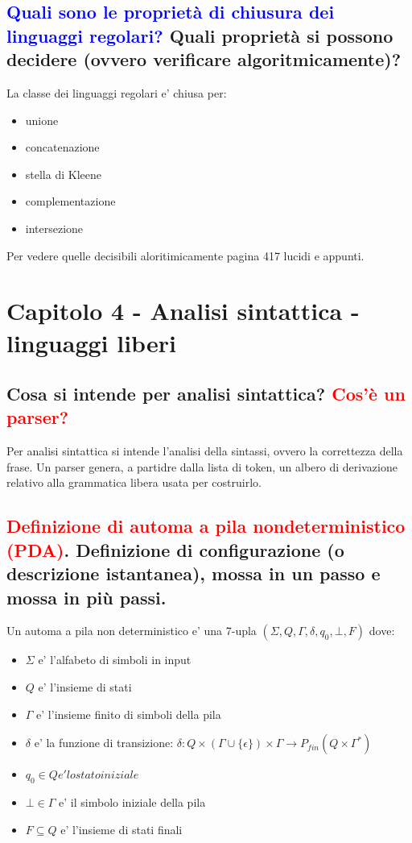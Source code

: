 \documentclass{article}
\begin{document}
\subsection{\textcolor{blue}{Quali sono le proprietà di chiusura dei linguaggi regolari?} Quali proprietà si possono decidere (ovvero verificare algoritmicamente)?}
La classe dei linguaggi regolari e' chiusa per:
\begin{itemize}
    \item unione
    \item concatenazione
    \item stella di Kleene
    \item complementazione
    \item intersezione
\end{itemize}
Per vedere quelle decisibili aloritimicamente pagina 417 lucidi e appunti.

\section{Capitolo 4 - Analisi sintattica - linguaggi liberi}
\subsection{Cosa si intende per analisi sintattica? \textcolor{red} {Cos'è un parser?}}
Per analisi sintattica si intende l'analisi della sintassi, ovvero la correttezza della frase. Un parser genera, a partidre dalla lista di token, un albero di derivazione
relativo alla grammatica libera usata per costruirlo.
\subsection{\textcolor{red}{Definizione di automa a pila nondeterministico (PDA)}.
    Definizione di configurazione (o descrizione istantanea),
    mossa in un passo e mossa in più passi.}
Un automa a pila non deterministico e' una 7-upla $(\Sigma, Q, \Gamma, \delta, q_0, \bot, F)$ dove:
\begin{itemize}
    \item $\Sigma$ e' l'alfabeto di simboli in input
    \item $Q$ e' l'insieme di stati
    \item $\Gamma$ e' l'insieme finito di simboli della pila
    \item $\delta$ e' la funzione di transizione: $\delta: Q \times (\Gamma \cup \{\epsilon\}) \times \Gamma \rightarrow P_{fin}(Q\times \Gamma^*)$
    \item $q_0 \in Q e' lo stato iniziale$
    \item $\bot \in \Gamma$ e' il simbolo iniziale della pila
    \item $F \subseteq Q$ e' l'insieme di stati finali
\end{itemize}
\end{document}

